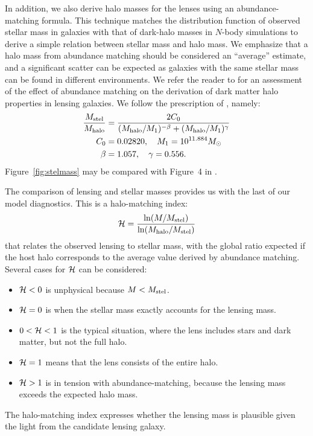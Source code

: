 In addition, we also derive halo masses for the lenses using an
abundance-matching formula.  This technique matches the distribution
function of observed stellar mass in galaxies with that of dark-halo
masses in $N$-body simulations to derive a simple relation between
stellar mass and halo mass.  We emphasize that a halo mass from
abundance matching should be considered an ``average'' estimate, and a
significant scatter can be expected as galaxies with the same stellar
mass can be found in different environments. We refer the reader to
\cite{2012MNRAS.424..104L} for an assessment of the effect of
abundance matching on the derivation of dark matter halo properties in
lensing galaxies. We follow the prescription of
\citet{2010ApJ...710..903M}, namely:
\begin{equation}
\begin{aligned}
\frac{M_\text{stel}}{M_\text{halo}} &= \frac{2C_0}{(M_\text{halo}/M_1)^{-\beta} +
                                     (M_\text{halo}/M_1)^\gamma} \\
C_0 &= 0.02820, \quad M_1 = 10^{11.884} M_\odot \\
\beta &= 1.057, \quad \gamma = 0.556.
\end{aligned}
\end{equation}
Figure~\ref{fig:stelmass} may be compared with Figure~4 in
\cite{2011ApJ...734...69M}.

The comparison of lensing and stellar masses provides us with the last
of our model diagnostics.  This is a halo-matching index:
\begin{equation}
\mathcal{H} = \frac{\ln(M/M_\text{stel})}{\ln(M_\text{halo}/M_\text{stel})}
\end{equation}
that relates the observed lensing to stellar mass, with the
global ratio expected if the host halo corresponds to the
average value derived by abundance matching. Several cases
for $\mathcal{H}$ can be considered:
\begin{itemize}
\item $\mathcal{H} < 0$ is unphysical because $M<M_\text{stel}$.
\item $\mathcal{H} = 0$ is when the stellar mass exactly accounts for the
  lensing mass.
\item $0 < \mathcal{H} < 1$ is the typical situation, where the lens
  includes stars and dark matter, but not the full halo.
\item $\mathcal{H} = 1$ means that the lens consists of the entire halo.
\item $\mathcal{H} > 1$ is in tension with abundance-matching, because the
  lensing mass exceeds the expected halo mass.
\end{itemize}
The halo-matching index expresses whether the lensing mass is
plausible given the light from the candidate lensing galaxy.

